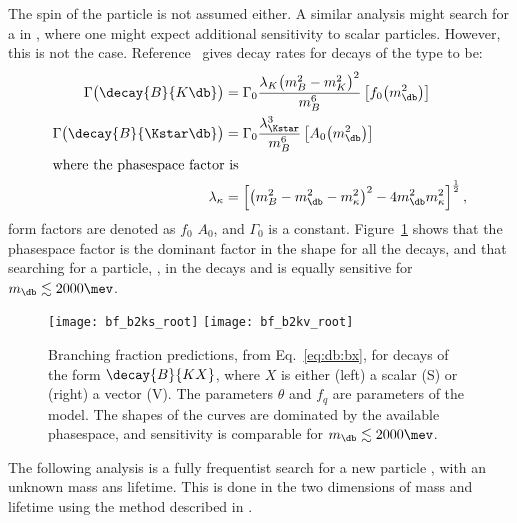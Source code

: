 The spin of the particle is not assumed either.
A similar analysis might search for a \db in \decay{\Bp}{\Kp\mumu}, where one might expect
additional sensitivity to scalar particles.
However, this is not the case.
Reference~\cite{Batell:2009jf} gives decay rates for decays of the type  to be:
\begin{align}
  \Gamma\big(\decay{B}{K\db}\big) &= \Gamma_0
  \frac{\lambda_{K}\big(m_{B}^2-m_{K}^2\big)^2}{m_{B}^6}
  \left[f_0\!\left(m_\db^2\right)\right]
  \\
  \Gamma\big(\decay{B}{\Kstar\db}\big) &= \Gamma_0
  \frac{\lambda_{\Kstar}^3}{m_{B}^6}
  \left[A_0\!\left(m_\db^2\right)\right]
  \\
  \intertext{where the phasespace factor is}
  \lambda_\kappa &= \left[
    \left( m_B^2 - m_\db^2 - m_\kappa^2 \right)^2
    -4m_\db^2m_\kappa^2
    \right]^\frac12,
    \label{eq:db:bx}
\end{align}
form factors are denoted as $f_0$ $A_0$, and $\Gamma_0$  is a constant.
Figure~\ref{fig:db:kx} shows that the phasespace factor is the dominant factor in the shape for all
the decays, and that searching for a particle, \db, in the decays \decay{\Bd}{\Kstarz\db} and
\decay{\Bp}{\Kp\db} is equally sensitive for $m_\db\lesssim2000\mev$.


\begin{figure}
  \begin{center}
    \texttt{[image: bf\_b2ks\_root]}
    \texttt{[image: bf\_b2kv\_root]}
    \caption{\small
      Branching fraction predictions, from Eq.~\protect\ref{eq:db:bx},
      for decays of the form $\decay{B}{KX}$, where $X$ is either
      (left) a scalar (S) or
      (right) a vector (V).
      The parameters $\theta$ and $f_q$ are parameters of the model.
      The shapes of the curves are dominated by the available phasespace, and sensitivity is
      comparable for $m_\db\lesssim2000\mev$.
    }
    \label{fig:db:kx}
  \end{center}
\end{figure}


The following analysis is a fully frequentist search for a new particle \db, with an unknown mass
ans lifetime.
This is done in the two dimensions of mass and lifetime using the method described in
.


